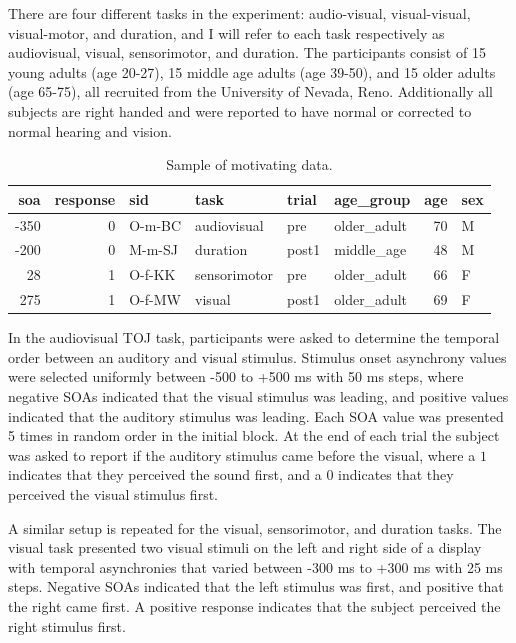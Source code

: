 \documentclass[11pt, oneside, openany]{scrbook}
\begin{document}
There are four different tasks in the experiment: audio-visual, visual-visual, visual-motor, and duration, and I will refer to each task respectively as audiovisual, visual, sensorimotor, and duration. The participants consist of 15 young adults (age 20-27), 15 middle age adults (age 39-50), and 15 older adults (age 65-75), all recruited from the University of Nevada, Reno. Additionally all subjects are right handed and were reported to have normal or corrected to normal hearing and vision.

\begin{table}[!h]

\caption{\label{tab:ch020-multitask-data}Sample of motivating data.}
\centering
\begin{tabular}[t]{rrllllrl}
\toprule
soa & response & sid & task & trial & age\_group & age & sex\\
\midrule
-350 & 0 & O-m-BC & audiovisual & pre & older\_adult & 70 & M\\
-200 & 0 & M-m-SJ & duration & post1 & middle\_age & 48 & M\\
28 & 1 & O-f-KK & sensorimotor & pre & older\_adult & 66 & F\\
275 & 1 & O-f-MW & visual & post1 & older\_adult & 69 & F\\
\bottomrule
\end{tabular}
\end{table}

In the audiovisual TOJ task, participants were asked to determine the temporal order between an auditory and visual stimulus. Stimulus onset asynchrony values were selected uniformly between -500 to +500 ms with 50 ms steps, where negative SOAs indicated that the visual stimulus was leading, and positive values indicated that the auditory stimulus was leading. Each SOA value was presented 5 times in random order in the initial block. At the end of each trial the subject was asked to report if the auditory stimulus came before the visual, where a \(1\) indicates that they perceived the sound first, and a \(0\) indicates that they perceived the visual stimulus first.

A similar setup is repeated for the visual, sensorimotor, and duration tasks. The visual task presented two visual stimuli on the left and right side of a display with temporal asynchronies that varied between -300 ms to +300 ms with 25 ms steps. Negative SOAs indicated that the left stimulus was first, and positive that the right came first. A positive response indicates that the subject perceived the right stimulus first.
\end{document}
